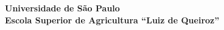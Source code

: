 \documentclass[book,A4paper,10pt,twoside,oldfontcommands]{memoir}\usepackage[]{graphicx}\usepackage[usenames,dvipsnames]{color}
\begin{document}
\newcommand{\PalavrasChaveFicha}{%
  1. Aaaaaaaaa  2. Bbbbbbbbbb bbb 3. Ccccc 4. {\it Dddddd eeeeeeee}
  L.\
}



\newcommand{\PalavrasChave}{%
  Aaaaaaaaa, Bbbbbbbbbb bbb, Ccccc, {\it Dddddd eeeeeeee} L.\
}

\newcommand{\Keywords}{%
  Eee, Fff, Ggg, {\it Hhh iii}
}




\thispagestyle{empty}


\begin{center}
  { \fontsize{14}{14} \sffamily \bfseries
    Universidade de São Paulo\\
    Escola Superior de Agricultura “Luiz de Queiroz”\\
    \CENA
  }
\end{center}


\vfill %
\end{document}
